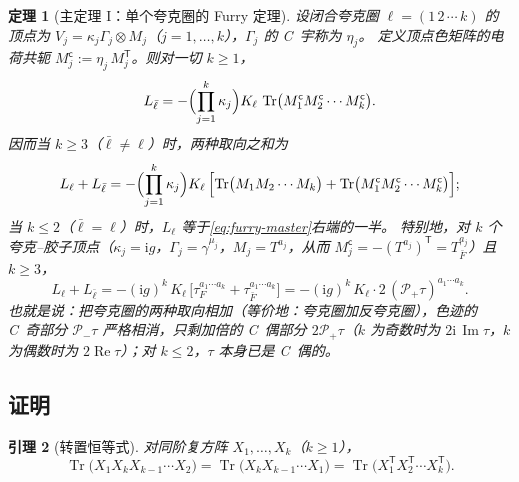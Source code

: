 \documentclass[UTF8,a4paper,11pt,fontset=fandol]{ctexart}
\theoremstyle{cplain}
\newtheorem{theorem}{定理}[section]
\newtheorem{lemma}[theorem]{引理}
\theoremstyle{cdefinition}
\theoremstyle{cremark}
\numberwithin{equation}{section}
\DeclareMathOperator{\Tr}{Tr}
\DeclareMathOperator{\Real}{Re}
\DeclareMathOperator{\Imag}{Im}
\newcommand{\tp}{\mathsf{T}}                         %
\newcommand{\Pp}{\mathcal{P}_{+}}                    %
\newcommand{\Pm}{\mathcal{P}_{-}}                    %
\newcommand{\ii}{\mathrm{i}}                        %
\begin{document}
\begin{theorem}[主定理 I：单个夸克圈的 Furry 定理]\label{thm:furry-single}
设闭合夸克圈 $\ell=(1\,2\,\cdots\,k)$ 的顶点为 $V_j=\kappa_j\Gamma_j\otimes M_j$（$j=1,\dots,k$），$\Gamma_j$ 的 C~宇称为 $\eta_j$。
定义顶点色矩阵的电荷共轭 $M_j^{\mathsf c}:=\eta_j\,M_j^{\tp}$。则对一切 $k\ge1$，
\begin{equation}\label{eq:master}
L_{\bar\ell}=-\Bigl(\prod_{j=1}^{k}\kappa_j\Bigr)K_\ell\,\Tr\bigl(M_1^{\mathsf c}M_2^{\mathsf c}\cdots M_k^{\mathsf c}\bigr).
\end{equation}
因而当 $k\ge3$（$\bar\ell\neq\ell$）时，两种取向之和为
\begin{equation}\label{eq:furry-master}
L_\ell+L_{\bar\ell}=-\Bigl(\prod_{j=1}^{k}\kappa_j\Bigr)K_\ell\,\Bigl[\Tr\bigl(M_1M_2\cdots M_k\bigr)+\Tr\bigl(M_1^{\mathsf c}M_2^{\mathsf c}\cdots M_k^{\mathsf c}\bigr)\Bigr];
\end{equation}
当 $k\le2$（$\bar\ell=\ell$）时，$L_\ell$ 等于\cref{eq:furry-master}右端的一半。
特别地，对 $k$ 个夸克--胶子顶点（$\kappa_j=\ii g$，$\Gamma_j=\gamma^{\mu_j}$，$M_j=T^{a_j}$，从而 $M_j^{\mathsf c}=-(T^{a_j})^{\tp}=T^{a_j}_{\bar F}$）且 $k\ge3$，
\begin{equation}\label{eq:furry-single}
L_\ell+L_{\bar\ell}=-(\ii g)^k\,K_\ell\,\bigl[\tau_F^{a_1\cdots a_k}+\tau_{\bar F}^{a_1\cdots a_k}\bigr]=-(\ii g)^k\,K_\ell\cdot2\,(\Pp\tau)^{a_1\cdots a_k}.
\end{equation}
也就是说：把夸克圈的两种取向相加（等价地：夸克圈加反夸克圈），色迹的 C~奇部分 $\Pm\tau$ 严格相消，只剩加倍的 C~偶部分 $2\Pp\tau$（$k$ 为奇数时为 $2\ii\,\Imag\tau$，$k$ 为偶数时为 $2\Real\tau$）；对 $k\le2$，$\tau$ 本身已是 C~偶的。
\end{theorem}

\subsection{证明}\label{sec:thmI-proof}

\begin{lemma}[转置恒等式]\label{lem:thmI-transpose}
对同阶复方阵 $X_1,\dots,X_k$（$k\ge1$），
\begin{equation}\label{eq:thmI-transpose}
\Tr\bigl(X_1X_kX_{k-1}\cdots X_2\bigr)=\Tr\bigl(X_kX_{k-1}\cdots X_1\bigr)=\Tr\bigl(X_1^{\tp}X_2^{\tp}\cdots X_k^{\tp}\bigr).
\end{equation}
\end{lemma}
\end{document}
